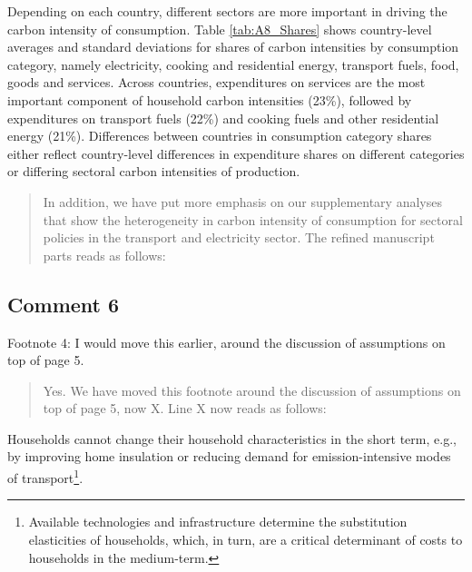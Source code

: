 \documentclass[11pt]{article}
\newenvironment{response}
{\begin{quote}\color{black}}
{\end{quote}}
\begin{document}
\begin{revisionbox}
    Depending on each country, different sectors are more important in driving the carbon intensity of consumption. Table \ref{tab:A8_Shares} shows country-level averages and standard deviations for shares of carbon intensities by consumption category, namely electricity, cooking and residential energy, transport fuels, food, goods and services. Across countries, expenditures on services are the most important component of household carbon intensities (23\%), followed by expenditures on transport fuels (22\%) and cooking fuels and other residential energy (21\%). Differences between countries in consumption category shares either reflect country-level differences in expenditure shares on different categories or differing sectoral carbon intensities of production.
\end{revisionbox}

\begin{response}
    In addition, we have put more emphasis on our supplementary analyses that show the heterogeneity in carbon intensity of consumption for sectoral policies in the transport and electricity sector. The refined manuscript parts reads as follows:
\end{response}

\subsection*{Comment 6}\label{comment_R2_6}

\begin{commentbox}
    Footnote 4: I would move this earlier, around the discussion of assumptions on top of page 5.
\end{commentbox}

\begin{response}
    Yes. We have moved this footnote around the discussion of assumptions on top of page 5, now X. Line X now reads as follows:
\end{response}

\begin{revisionbox}
    Households cannot change their household characteristics in the short term, e.g., by improving home insulation or reducing demand for emission-intensive modes of transport\footnote{Available technologies and infrastructure determine the substitution elasticities of households, which, in turn, are a critical determinant of costs to households in the medium-term.}.
\end{revisionbox}
\end{document}
